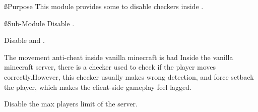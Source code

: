 \ss{Purpose}
This module provides some  to disable checkers inside .

\ss{Sub-Module}
Disable .

Disable  and .

\begin{warn}{The movement anti-cheat inside vanilla minecraft is bad}
    Inside the vanilla minecraft server, there is a checker used to check if the player moves correctly.However, this checker usually makes wrong detection, and force setback the player, which makes the client-side gameplay feel lagged.
\end{warn}

Disable the max players limit of the server.
